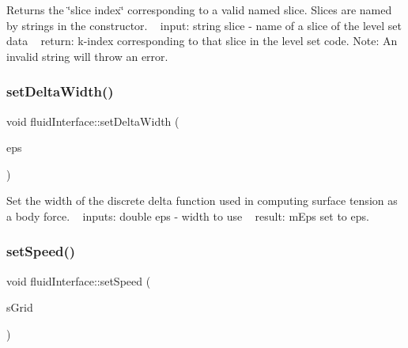 Returns the \char`\"{}slice index\char`\"{} corresponding to a valid named slice. Slices are named by strings in the constructor. ~\newline
input\+: string slice -\/ name of a slice of the level set data ~\newline
return\+: k-\/index corresponding to that slice in the level set code. Note\+: An invalid string will throw an error. \mbox{\label{classfluidInterface_a05ce87aa6e5aeb08a62067b0122e5956}} 
\subsubsection{\texorpdfstring{set\+Delta\+Width()}{setDeltaWidth()}}
{\footnotesize\ttfamily void fluid\+Interface\+::set\+Delta\+Width (\begin{DoxyParamCaption}\item[{const double}]{eps }\end{DoxyParamCaption})}

Set the width of the discrete delta function used in computing surface tension as a body force. ~\newline
inputs\+: double eps -\/ width to use ~\newline
result\+: m\+Eps set to eps. \mbox{\label{classfluidInterface_a0d4ca41c526fb3af9fc2d7da418d4569}} 
\subsubsection{\texorpdfstring{set\+Speed()}{setSpeed()}}
{\footnotesize\ttfamily void fluid\+Interface\+::set\+Speed (\begin{DoxyParamCaption}\item[{const \hyperlink{classstokesGrid}{stokes\+Grid} $\ast$}]{s\+Grid }\end{DoxyParamCaption})}

